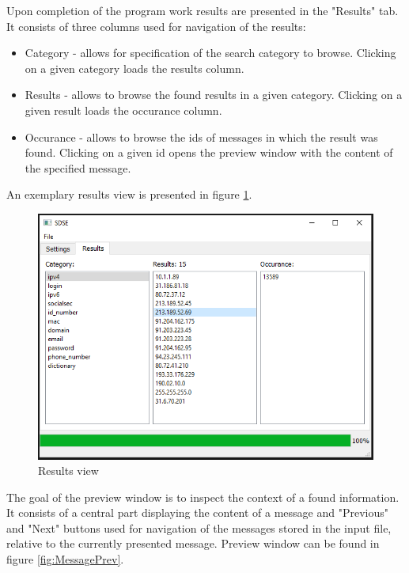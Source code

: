 \documentclass[a4paper,twoside,12pt]{book}
\begin{document}
Upon completion of the program work results are presented in the "Results" tab. It consists of three columns used for
navigation of the results: 
\begin{itemize}
   \item Category - allows for specification of the search category to browse. Clicking on a given category loads
   the results column.
   \item Results - allows to browse the found results in a given category. Clicking on a given result loads the 
   occurance column.
   \item Occurance - allows to browse the ids of messages in which the result was found. Clicking on a given id
   opens the preview window with the content of the specified message.
\end{itemize}

An exemplary results view is presented in figure \ref{fig:ResultsTab}.

\begin{figure}
\centering
\includegraphics{ResultsTab}
\caption{Results view}
\label{fig:ResultsTab}
\end{figure}

The goal of the preview window is to inspect the context of a found information. It consists of a central part 
displaying the content of a message and "Previous" and "Next" buttons used for navigation of the messages stored
in the input file, relative to the currently presented message. Preview window can be found in figure \ref{fig:MessagePrev}.
\end{document}
